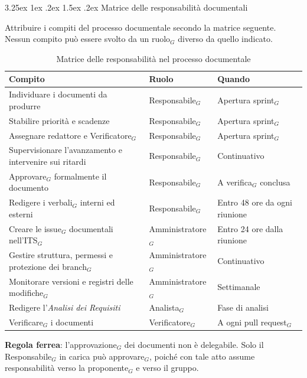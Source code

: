 \documentclass[a4paper, 10pt]{article}
\makeatletter
\renewcommand{\arraystretch}{1.2}
\renewcommand\paragraph{\@startsection{paragraph}{4}{\z@}%
  {3.25ex \@plus1ex \@minus .2ex}%
  {1.5ex \@plus .2ex}%
  {\normalfont\normalsize\bfseries}}
\makeatother
\begin{document}
\paragraph{Matrice delle responsabilità documentali}

Attribuire i compiti del processo documentale secondo la matrice seguente. Nessun compito può essere svolto da un ruolo$_G$ diverso da quello indicato.

\begin{table}[H]
    \centering
    \renewcommand{\arraystretch}{1.3}
    \begin{tabularx}{\textwidth}{|L|l|l|}
        \hline
        \textbf{Compito} & \textbf{Ruolo} & \textbf{Quando} \\
        \hline
        Individuare i documenti da produrre & Responsabile$_G$ & Apertura sprint$_G$ \\ \hline
        Stabilire priorità e scadenze & Responsabile$_G$ & Apertura sprint$_G$ \\ \hline
        Assegnare redattore e Verificatore$_G$ & Responsabile$_G$ & Apertura sprint$_G$ \\ \hline
        Supervisionare l'avanzamento e intervenire sui ritardi & Responsabile$_G$ & Continuativo \\ \hline
        Approvare$_G$ formalmente il documento & Responsabile$_G$ & A verifica$_G$ conclusa \\ \hline
        Redigere i verbali$_G$ interni ed esterni & Responsabile$_G$ & Entro 48 ore da ogni riunione \\ \hline
        Creare le issue$_G$ documentali nell'ITS$_G$ & Amministratore$_G$ & Entro 24 ore dalla riunione \\ \hline
        Gestire struttura, permessi e protezione dei branch$_G$ & Amministratore$_G$ & Continuativo \\ \hline
        Monitorare versioni e registri delle modifiche$_G$ & Amministratore$_G$ & Settimanale \\ \hline
        Redigere l'\emph{Analisi dei Requisiti} & Analista$_G$ & Fase di analisi \\ \hline
        Verificare$_G$ i documenti & Verificatore$_G$ & A ogni pull request$_G$ \\ \hline
    \end{tabularx}
    \caption{Matrice delle responsabilità nel processo documentale}
\end{table}

\noindent \textbf{Regola ferrea}: l'approvazione$_G$ dei documenti non è delegabile. Solo il Responsabile$_G$ in carica può approvare$_G$, poiché con tale atto assume responsabilità verso la proponente$_G$ e verso il gruppo.
\end{document}
